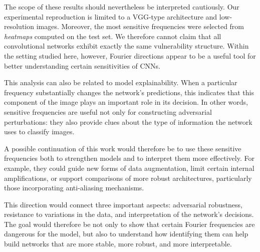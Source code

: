 The scope of these results should nevertheless be interpreted cautiously. Our experimental reproduction
is limited to a VGG-type architecture and low-resolution images. Moreover, the
most sensitive frequencies were selected from \textit{heatmaps} computed on
the test set. We therefore cannot claim that all convolutional networks exhibit
exactly the same vulnerability structure. Within the setting studied here, however, Fourier
directions appear to be a useful tool for better understanding certain sensitivities of CNNs.

This analysis can also be related to model explainability. When a
particular frequency substantially changes the network's predictions, this indicates that this component
of the image plays an important role in its decision. In other words, sensitive frequencies
are useful not only for constructing adversarial perturbations: they also provide clues
about the type of information the network uses to classify images.

A possible continuation of this work would therefore be to use these sensitive frequencies both to strengthen
models and to interpret them more effectively. For example, they could guide new
forms of data augmentation, limit certain internal amplifications, or support comparisons of
more robust architectures, particularly those incorporating anti-aliasing mechanisms.

This direction would connect three important aspects: adversarial robustness,
resistance to variations in the data, and interpretation of the network's decisions.
The goal would therefore be not only to show that certain Fourier frequencies are dangerous
for the model, but also to understand how identifying them can help build networks
that are more stable, more robust, and more interpretable.

